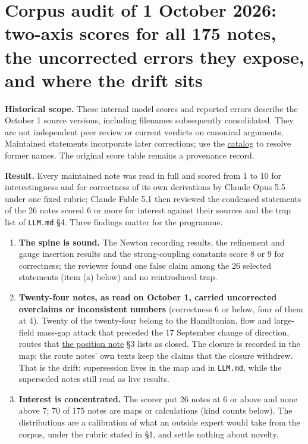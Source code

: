 \documentclass[11pt,a4paper]{article}
\newcommand{\tightlist}{\setlength{\itemsep}{0pt}\setlength{\parskip}{0pt}}
\begin{document}
\hypertarget{corpus-audit-of-1-october-2026-two-axis-scores-for-all-175-notes-the-uncorrected-errors-they-expose-and-where-the-drift-sits}{%
\section{Corpus audit of 1 October 2026: two-axis scores for all 175
notes, the uncorrected errors they expose, and where the drift
sits}\label{corpus-audit-of-1-october-2026-two-axis-scores-for-all-175-notes-the-uncorrected-errors-they-expose-and-where-the-drift-sits}}

\textbf{Historical scope.} These internal model scores and reported
errors describe the October 1 source versions, including filenames
subsequently consolidated. They are not independent peer review or
current verdicts on canonical arguments. Maintained statements
incorporate later corrections; use the \href{index.md}{catalog} to
resolve former names. The original score table remains a provenance
record.

\textbf{Result.} Every maintained note was read in full and scored from
1 to 10 for interestingness and for correctness of its own derivations
by Claude Opus 5.5 under one fixed rubric; Claude Fable 5.1 then
reviewed the condensed statements of the 26 notes scored 6 or more for
interest against their sources and the trap list of \texttt{LLM.md} §4.
Three findings matter for the programme.

\begin{enumerate}
\def\labelenumi{\arabic{enumi}.}
\tightlist
\item
  \textbf{The spine is sound.} The Newton recording results, the
  refinement and gauge insertion results and the strong-coupling
  constants score 8 or 9 for correctness; the reviewer found one false
  claim among the 26 selected statements (item (a) below) and no
  reintroduced trap.
\item
  \textbf{Twenty-four notes, as read on October 1, carried uncorrected
  overclaims or inconsistent numbers} (correctness 6 or below, four of
  them at 4). Twenty of the twenty-four belong to the Hamiltonian, flow
  and large-field mass-gap attack that preceded the 17 September change
  of direction, routes that
  \href{mass-gap-obligations-lattice.md\#existing-estimates-and-examined-routes}{the
  position note} §3 lists as closed. The closure is recorded in the map;
  the route notes' own texts keep the claims that the closure withdrew.
  That is the drift: supersession lives in the map and in
  \texttt{LLM.md}, while the superseded notes still read as live
  results.
\item
  \textbf{Interest is concentrated.} The scorer put 26 notes at 6 or
  above and none above 7; 70 of 175 notes are maps or calculations (kind
  counts below). The distributions are a calibration of what an outside
  expert would take from the corpus, under the rubric stated in §1, and
  settle nothing about novelty.
\end{enumerate}
\end{document}
